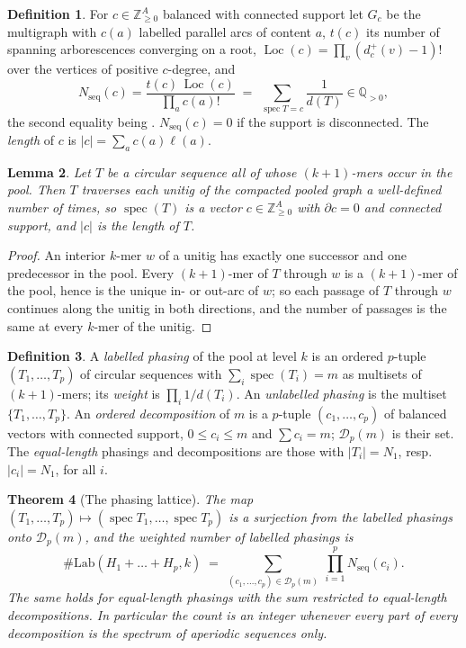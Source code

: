 \documentclass[11pt]{article}
\theoremstyle{plain}
\newtheorem{theorem}{Theorem}
\newtheorem{lemma}[theorem]{Lemma}
\theoremstyle{definition}
\newtheorem{definition}[theorem]{Definition}
\theoremstyle{remark}
\newcommand{\Z}{\mathbb{Z}}
\newcommand{\Q}{\mathbb{Q}}
\newcommand{\spec}{\operatorname{spec}}
\newcommand{\Loc}{\operatorname{Loc}}
\newcommand{\Nseq}{N_{\mathrm{seq}}}
\newcommand{\Lab}{\#\mathrm{Lab}}
\begin{document}
\begin{definition}\label{def:nseq}
For $c\in\Z^A_{\ge0}$ balanced with connected support let $G_c$ be the multigraph with $c(a)$
labelled parallel arcs of content $a$, $t(c)$ its number of spanning arborescences
converging on a root, $\Loc(c)=\prod_v(d^+_c(v)-1)!$ over the vertices of positive $c$-degree,
and
\[
  \Nseq(c)=\frac{t(c)\,\Loc(c)}{\prod_a c(a)!}\;=\;\sum_{\spec T=c}\frac1{d(T)}\in\Q_{>0},
\]
the second equality being \cite[Thm.~6]{Bio8}. $\Nseq(c)=0$ if the support is disconnected.
The \emph{length} of $c$ is $|c|=\sum_a c(a)\ell(a)$.
\end{definition}

\begin{lemma}\label{lem:spectrum}
Let $T$ be a circular sequence all of whose $(k{+}1)$-mers occur in the pool. Then $T$
traverses each unitig of the compacted pooled graph a well-defined number of times, so
$\spec(T)$ is a vector $c\in\Z^A_{\ge0}$ with $\partial c=0$ and connected support, and
$|c|$ is the length of $T$.
\end{lemma}

\begin{proof}
An interior $k$-mer $w$ of a unitig has exactly one successor and one predecessor in the pool.
Every $(k{+}1)$-mer of $T$ through $w$ is a $(k{+}1)$-mer of the pool, hence is the unique
in- or out-arc of $w$; so each passage of $T$ through $w$ continues along the unitig in both
directions, and the number of passages is the same at every $k$-mer of the unitig.
\end{proof}

\begin{definition}\label{def:phasing}
A \emph{labelled phasing} of the pool at level $k$ is an ordered $p$-tuple $(T_1,\dots,T_p)$
of circular sequences with $\sum_i\spec(T_i)=m$ as multisets of $(k{+}1)$-mers; its
\emph{weight} is $\prod_i 1/d(T_i)$. An \emph{unlabelled phasing} is the multiset
$\{T_1,\dots,T_p\}$. An \emph{ordered decomposition} of $m$ is a $p$-tuple
$(c_1,\dots,c_p)$ of balanced vectors with connected support, $0\le c_i\le m$ and
$\sum c_i=m$; $\mathcal D_p(m)$ is their set. The \emph{equal-length} phasings and
decompositions are those with $|T_i|=N_1$, resp.\ $|c_i|=N_1$, for all $i$.
\end{definition}

\begin{theorem}[The phasing lattice]\label{thm:lattice}
The map $(T_1,\dots,T_p)\mapsto(\spec T_1,\dots,\spec T_p)$ is a surjection from the labelled
phasings onto $\mathcal D_p(m)$, and the weighted number of labelled phasings is
\[
  \Lab(H_1{+}\dots{+}H_p,k)\;=\;\sum_{(c_1,\dots,c_p)\in\mathcal D_p(m)}\ \prod_{i=1}^p\Nseq(c_i).
\]
The same holds for equal-length phasings with the sum restricted to equal-length
decompositions. In particular the count is an integer whenever every part of every
decomposition is the spectrum of aperiodic sequences only.
\end{theorem}
\end{document}
